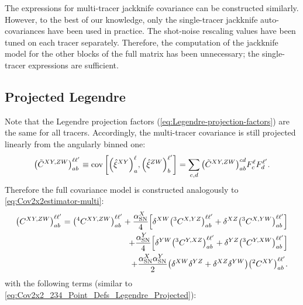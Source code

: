 The expressions for multi-tracer jackknife covariance can be constructed similarly.
However, to the best of our knowledge, only the single-tracer jackknife auto-covariances have been used in practice.
The shot-noise rescaling values have been tuned on each tracer separately.
Therefore, the computation of the jackknife model for the other blocks of the full matrix has been unnecessary; the single-tracer expressions are sufficient.

\subsection{Projected Legendre}
\label{sec:cov-estimation-multi-legendre-projected}

Note that the Legendre projection factors (\cref{eq:Legendre-projection-factors}) are the same for all tracers.
Accordingly, the multi-tracer covariance is still projected linearly from the angularly binned one:
\begin{equation} \label{eq:full-cov-projection-Legendre-multi}
    \qty(\tilde C^{XY,ZW})_{ab}^{\ell\ell'} \equiv \operatorname{cov} \qty[\qty(\hat \xi^{XY})^\ell_a, \qty(\hat \xi^{ZW})^{\ell'}_b] = \sum_{c,d} \qty(\tilde C^{XY,ZW})_{ab}^{cd} F^\ell_c F^{\ell'}_d.
\end{equation}
Therefore the full covariance model is constructed analogously to \cref{eq:Cov2x2estimator-multi}:
\begin{align} \label{eq:cov2x2_Legendre-multi}
\qty(C^{XY,ZW})_{ab}^{\ell\ell'} = \qty(^4C^{XY,ZW})_{ab}^{\ell\ell'} + \frac{\alpha_{\rm SN}^X}{4} \qty[\delta^{XW} \qty(^3C^{X,YZ})_{ab}^{\ell\ell'} + \delta^{XZ} \qty(^3C^{X,YW})_{ab}^{\ell\ell'}] \\ \nonumber
+ \frac{\alpha_{\rm SN}^Y}{4} \qty[\delta^{YW} \qty(^3C^{Y,XZ})_{ab}^{\ell\ell'} + \delta^{YZ} \qty(^3C^{Y,XW})_{ab}^{\ell\ell'}] \\ \nonumber
+ \frac{\alpha_{\rm SN}^X \alpha_{\rm SN}^Y}{2} \qty(\delta^{XW} \delta^{YZ} + \delta^{XZ} \delta^{YW}) \qty(^2C^{XY})_{ab}^{\ell\ell'}.
\end{align}
with the following terms (similar to \cref{eq:Cov2x2_234_Point_Defs_Legendre_Projected}):
